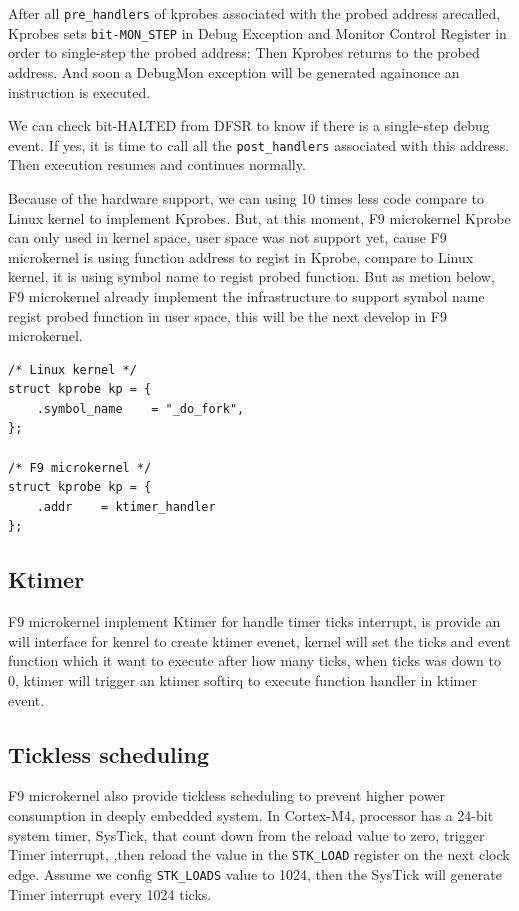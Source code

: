 \documentclass[10pt,preprint,nocopyrightspace]{sigplanconf}
\begin{document}
After all \texttt{pre\_handlers} of kprobes associated with the probed address arecalled, Kprobes sets \texttt{bit-MON\_STEP} in Debug Exception and Monitor Control Register in order to single-step the probed address; Then Kprobes returns to
the probed address. And soon a DebugMon exception will be generated againonce an instruction is executed.

We can check bit-HALTED from DFSR to know if there is a single-step debug event. If yes, it is time to call all the \texttt{post\_handlers} associated with this address. Then execution resumes and continues normally.

Because of the hardware support, we can using 10 times less code compare to Linux kernel to implement Kprobes. But, at this moment, F9 microkernel Kprobe can only used in kernel space, user space was not support yet, cause F9 microkernel is using function address to regist in Kprobe, compare to Linux kernel, it is using symbol name to regist 
probed function. But as metion below, F9 microkernel already implement the infrastructure to support symbol name regist probed function in user space, this will be the next develop in F9 microkernel.

\begin{lstlisting}[basicstyle=\small,frame=single]
/* Linux kernel */
struct kprobe kp = {
	.symbol_name    = "_do_fork",
};

/* F9 microkernel */
struct kprobe kp = {
	.addr    = ktimer_handler
};

\end{lstlisting}

\subsection{Ktimer}
F9 microkernel implement Ktimer for handle timer ticks interrupt, is provide an will interface for kenrel to create ktimer evenet, kernel will set the ticks and event function which it want to execute after how many ticks, when ticks was down to 0, ktimer will trigger an ktimer softirq to execute function handler in ktimer event. 

\subsection{Tickless scheduling}

F9 microkernel also provide tickless scheduling to prevent higher power consumption in deeply embedded system\cite{freertos1,freertos2}. In Cortex-M4, processor has a 24-bit system timer, SysTick, that count down from the reload value to zero, trigger Timer interrupt, ,then reload the value in the \verb|STK_LOAD| register on the next clock edge\cite{st2016manual}. Assume we config \verb|STK_LOADS| value to 1024, then the SysTick will generate Timer interrupt every 1024 ticks.
\end{document}
